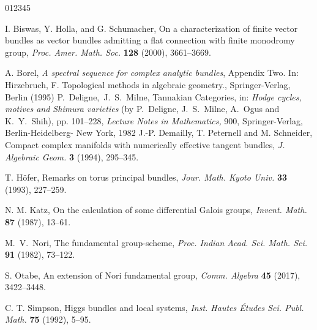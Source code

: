 \documentclass[12pt]{amsart}
\theoremstyle{definition}
\numberwithin{equation}{section}
\begin{document}
\begin{thebibliography}{012345}

 I. Biswas, Y. Holla, and G. Schumacher, On a characterization of finite vector bundles 
as vector bundles admitting a flat connection with finite monodromy group, {\it Proc. Amer. Math. Soc.}
{\bf 128} (2000), 3661--3669.

 A. Borel, \emph{A spectral sequence for complex analytic bundles}, Appendix Two. 
		In: Hirzebruch, F. Topological methods in algebraic geometry., Springer-Verlag, Berlin 	
		(1995)
 P.~Deligne,~J.~S.~Milne, Tannakian Categories, in:
         {\it Hodge cycles, motives and Shimura varieties} (by P.~Deligne,
         J.~S.~Milne, A.~Ogus and K.~Y.~Shih), pp. 101--228, \emph{Lecture 
         Notes in Mathematics,} 900, Springer-Verlag, Berlin-Heidelberg- 
         New York, 1982
 J.-P. Demailly, T. Peternell and M. Schneider, Compact complex manifolds with 
		numerically effective tangent bundles, {\it J. Algebraic Geom.} {\bf 3} (1994), 295--345.

 T. H\"ofer, Remarks on torus principal bundles, {\it Jour. Math. Kyoto Univ.} 
{\bf 33} (1993), 227--259.

 N. M. Katz, On the calculation of some differential Galois groups, 
{\it Invent. Math.} {\bf 87} (1987), 13--61.

	 M.~V.~Nori, The fundamental group-scheme,
{\it Proc. Indian Acad. Sci. Math. Sci.} \textbf{91} (1982), 73--122. 

 S. Otabe, An extension of Nori fundamental group,
{\it Comm. Algebra} \textbf{45} (2017), 3422--3448.
	
 C. T. Simpson, Higgs bundles and local systems,
{\it Inst. Hautes \'Etudes Sci. Publ. Math.} {\bf 75} (1992), 5--95. 

\end{thebibliography}
\end{document}
